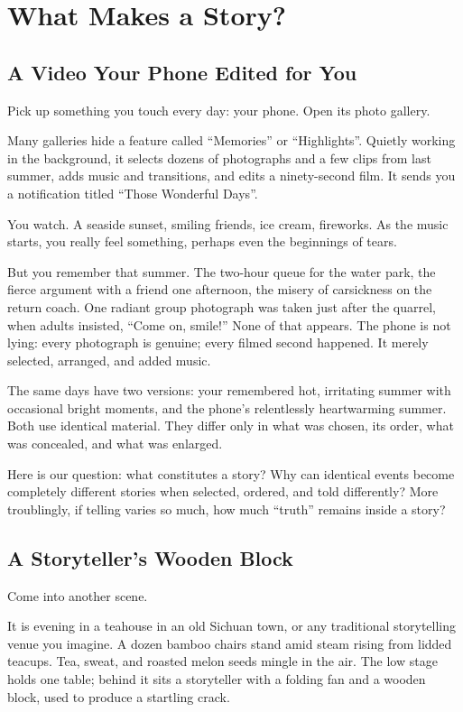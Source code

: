 \chapter{What Makes a Story?}
\section{A Video Your Phone Edited for You}
Pick up something you touch every day: your phone. Open its photo gallery.

Many galleries hide a feature called ``Memories'' or ``Highlights''. Quietly working in the background, it selects dozens of photographs and a few clips from last summer, adds music and transitions, and edits a ninety-second film. It sends you a notification titled ``Those Wonderful Days''.

You watch. A seaside sunset, smiling friends, ice cream, fireworks. As the music starts, you really feel something, perhaps even the beginnings of tears.

But you remember that summer. The two-hour queue for the water park, the fierce argument with a friend one afternoon, the misery of carsickness on the return coach. One radiant group photograph was taken just after the quarrel, when adults insisted, ``Come on, smile!'' None of that appears. The phone is not lying: every photograph is genuine; every filmed second happened. It merely selected, arranged, and added music.

The same days have two versions: your remembered hot, irritating summer with occasional bright moments, and the phone's relentlessly heartwarming summer. Both use identical material. They differ only in what was chosen, its order, what was concealed, and what was enlarged.

Here is our question: what constitutes a story? Why can identical events become completely different stories when selected, ordered, and told differently? More troublingly, if telling varies so much, how much ``truth'' remains inside a story?

\section{A Storyteller's Wooden Block}
Come into another scene.

It is evening in a teahouse in an old Sichuan town, or any traditional storytelling venue you imagine. A dozen bamboo chairs stand amid steam rising from lidded teacups. Tea, sweat, and roasted melon seeds mingle in the air. The low stage holds one table; behind it sits a storyteller with a folding fan and a wooden block, used to produce a startling crack.


